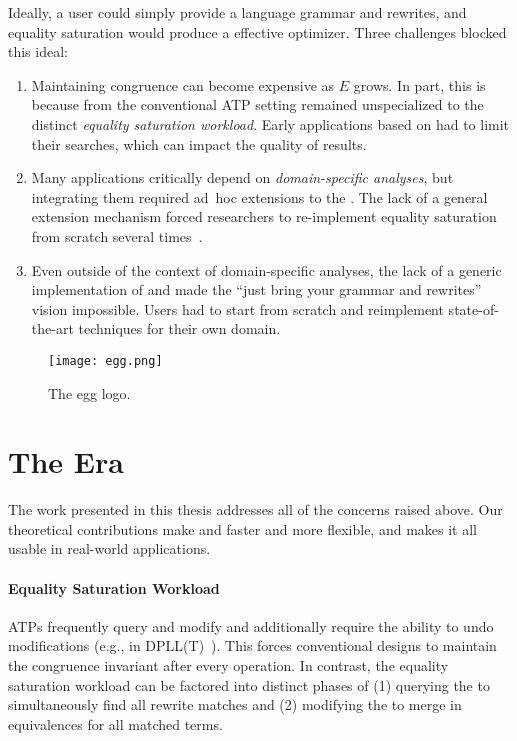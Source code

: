 Ideally, a user could simply provide
  a language grammar and rewrites,
  and equality saturation would produce a effective optimizer.
Three challenges blocked this ideal:
\begin{enumerate}
\item
Maintaining congruence can become expensive as $E$ grows.
In part, this is because \egraphs from the conventional ATP setting
  remained unspecialized to the distinct \textit{equality saturation workload}.
Early applications based on \eqsat had to limit
 their searches, which can impact the quality of results.
\item
Many applications critically depend on
  \textit{domain-specific analyses}, but
  integrating them required ad~hoc extensions to the \egraph.
The lack of a general extension mechanism
  forced researchers to re-implement
  equality saturation from scratch several times~\cite{herbie, eqsat, wu_siga19}.
\item
Even outside of the context of domain-specific analyses,
 the lack of a generic implementation of \egraphs and \eqsat
 made the ``just bring your grammar and rewrites'' vision impossible.
 Users had to start from scratch and reimplement state-of-the-art
  techniques for their own domain.
\end{enumerate}

\begin{wrapfigure}{r}{6cm}
  \centering
  \vspace{-22mm}
  \texttt{[image: egg.png]}
  \caption{The egg logo.}
  \label{fig:egg-logo}
  \vspace{-1em}
\end{wrapfigure}

\section{The \egg Era}

The work presented in this thesis
 addresses all of the concerns raised above.
Our theoretical contributions
 make \egraphs and \eqsat faster and more flexible,
 and \egg makes it all usable in real-world applications.

\paragraph{Equality Saturation Workload}

ATPs frequently query and modify \egraphs and
  additionally require the ability to
  undo modifications (e.g., in  DPLL(T)~\cite{dpll}).
This forces conventional \egraph designs
  to maintain the congruence invariant after every operation.
In contrast,
  the equality saturation workload
  can be factored into distinct phases of
  (1) querying the \egraph to simultaneously find all rewrite matches and
  (2) modifying the \egraph to merge in equivalences for all matched terms.

